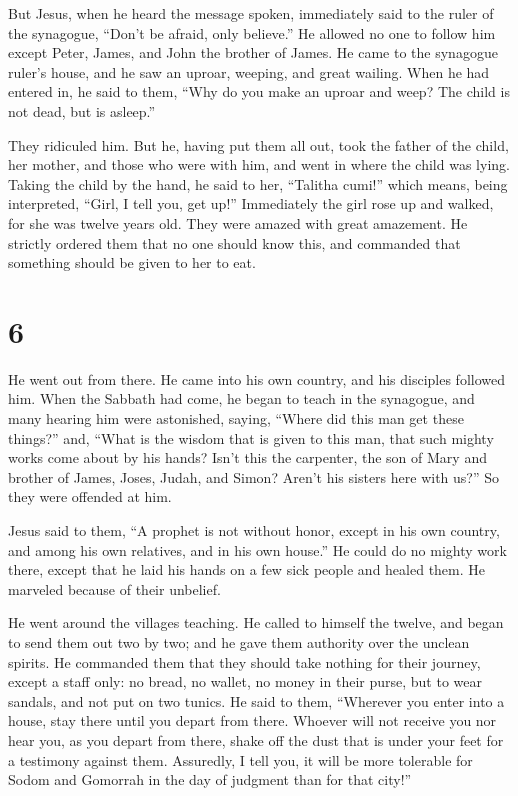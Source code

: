  But Jesus, when he heard the message spoken, immediately
said to the ruler of the synagogue, ``Don't be afraid, only believe.''
 He allowed no one to follow him except Peter, James, and
John the brother of James.  He came to the synagogue
ruler's house, and he saw an uproar, weeping, and great wailing.
 When he had entered in, he said to them, ``Why do you
make an uproar and weep? The child is not dead, but is asleep.''

 They ridiculed him. But he, having put them all out,
took the father of the child, her mother, and those who were with him,
and went in where the child was lying.  Taking the child
by the hand, he said to her, ``Talitha cumi!'' which means, being
interpreted, ``Girl, I tell you, get up!''  Immediately
the girl rose up and walked, for she was twelve years old. They were
amazed with great amazement.  He strictly ordered them
that no one should know this, and commanded that something should be
given to her to eat.

\hypertarget{section-5}{%
\section{6}\label{section-5}}

 He went out from there. He came into his own country, and
his disciples followed him.  When the Sabbath had come, he
began to teach in the synagogue, and many hearing him were astonished,
saying, ``Where did this man get these things?'' and, ``What is the
wisdom that is given to this man, that such mighty works come about by
his hands?  Isn't this the carpenter, the son of Mary and
brother of James, Joses, Judah, and Simon? Aren't his sisters here with
us?'' So they were offended at him.

 Jesus said to them, ``A prophet is not without honor,
except in his own country, and among his own relatives, and in his own
house.''  He could do no mighty work there, except that he
laid his hands on a few sick people and healed them.  He
marveled because of their unbelief.

He went around the villages teaching.  He called to
himself the twelve, and began to send them out two by two; and he gave
them authority over the unclean spirits.  He commanded
them that they should take nothing for their journey, except a staff
only: no bread, no wallet, no money in their purse,  but
to wear sandals, and not put on two tunics.  He said to
them, ``Wherever you enter into a house, stay there until you depart
from there.  Whoever will not receive you nor hear you,
as you depart from there, shake off the dust that is under your feet for
a testimony against them. Assuredly, I tell you, it will be more
tolerable for Sodom and Gomorrah in the day of judgment than for that
city!''

